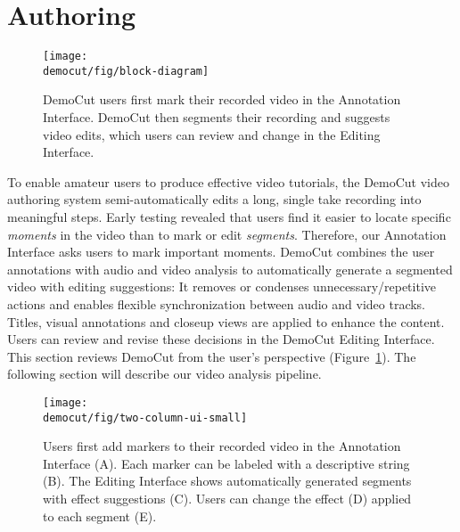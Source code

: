 \section{Authoring}

\begin{figure}[t!]
  \centering
  \texttt{[image: \\democut/fig/block-diagram]}
  \caption{DemoCut users first mark their recorded video in the Annotation Interface. DemoCut then segments their recording and suggests video edits, which users can review and change in the Editing Interface.}
  \label{fig:block-diagram}
\end{figure}

To enable amateur users to produce effective video tutorials, the DemoCut video authoring system semi-automatically edits a long, single take recording into meaningful steps.
Early testing revealed that users find it easier to locate specific {\em moments} in the video than to mark or edit {\em segments}. Therefore, our Annotation Interface asks users to mark important moments.
%
DemoCut combines the user annotations with audio and video analysis to automatically generate a segmented video with editing suggestions:
%
It removes or condenses unnecessary/repetitive actions and enables flexible synchronization between audio and video tracks.
Titles, visual annotations and closeup views are applied to enhance the content.
%
Users can review and revise these decisions in the DemoCut Editing Interface.
This section reviews DemoCut from the user's perspective (Figure~\ref{fig:block-diagram}). The following section will describe our video analysis pipeline.

\begin{figure*}[t!]
  \centering
  \texttt{[image: \\democut/fig/two-column-ui-small]}
  \caption{Users first add markers to their recorded video in the Annotation Interface (A). Each marker can be labeled with a descriptive string (B). The Editing Interface shows automatically generated segments with effect suggestions (C). Users can change the effect (D) applied to each segment (E).}
  \label{fig:ui}
\end{figure*}

